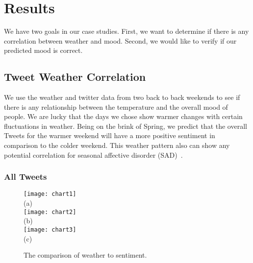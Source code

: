 \section{Results}

We have two goals in our case studies. First, we want to determine if there is any correlation between weather and mood. Second, we would like to verify if our predicted mood is correct.

%


\subsection{Tweet Weather Correlation}

We use the weather and twitter data from two back to back weekends to see if there is any relationship between the temperature and the overall mood of people. We are lucky that the days we chose show warmer changes with certain fluctuations in weather. Being on the brink of Spring, we predict that the overall Tweets for the warmer weekend will have a more positive sentiment in comparison to the colder weekend. This weather pattern also can show any potential correlation for seasonal affective disorder (SAD)~\cite{denissen2008effects}.

\subsubsection{All Tweets}


\begin{figure}[t]
\begin{center}
\texttt{[image: chart1]} \\
\mbox{\small{(a)}}\\
\texttt{[image: chart2]} \\
\mbox{\small{(b)}}\\
\texttt{[image: chart3]} \\
\mbox{\small{(c)}}
\end{center}
\vspace{-.1in}
\caption{The comparison of weather to sentiment.}
\label{fig:chart_1}
\end{figure}


